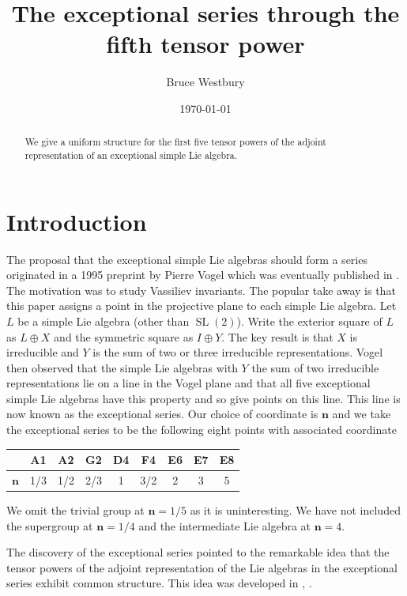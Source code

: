 \documentclass[12pt]{amsart}
\providecommand{\nv}{\mathbf{n}}
\providecommand{\SL}{\operatorname{SL}}
\begin{document}
\title{The exceptional series through the fifth tensor power}
\author{Bruce Westbury}
\date{\today}
\begin{abstract}
We give a uniform structure for the first five tensor powers of the adjoint representation
of an exceptional simple Lie algebra.
\end{abstract}
\maketitle
\tableofcontents

\section{Introduction}
The proposal that the exceptional simple Lie algebras should form a series originated in a 1995 preprint by Pierre Vogel which was eventually published in \cite{Vogel2011}. The motivation was to study Vassiliev invariants. The popular take away is that this paper assigns a point in the projective plane to each simple Lie algebra. Let $L$ be a simple Lie algebra (other than $\SL(2)$). Write
the exterior square of $L$ as $L\oplus X$ and the symmetric square as $I\oplus Y$. The key result
is that $X$ is irreducible and $Y$ is the sum of two or three irreducible representations. Vogel then observed that the simple Lie algebras with $Y$ the sum of two irreducible representations lie on a 
line in the Vogel plane and that all five exceptional simple Lie algebras have this property and so
give points on this line. This line is now known as the exceptional series. Our choice of
coordinate is $\nv$ and we take the exceptional series to be the following eight points
with associated coordinate
\begin{longtable}{ccccccccc}
	\toprule
	& A1 & A2 & G2 & D4 & F4 & E6 & E7 & E8 \\ 
	\midrule\endhead
	$\nv$ & 1/3  & 1/2 & 2/3 & 1 & 3/2 & 2 & 3 & 5 \\
	\bottomrule
\end{longtable}
We omit the trivial group at $\nv=1/5$ as it is uninteresting. 
We have not included the supergroup at $\nv=1/4$ and the intermediate Lie algebra at $\nv=4$.

The discovery of the exceptional series pointed to the remarkable idea that the tensor powers of
the adjoint representation of the Lie algebras in the exceptional series exhibit common structure. 
This idea was developed in \cite{deligne1996b}, \cite{deligne1996a}.
\end{document}
